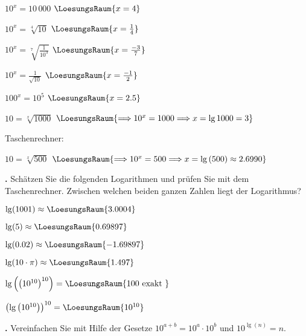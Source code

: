 \begin{bbwAufgabenBlock}
\item $10^x = 10\,000$ $\LoesungsRaum{x=4}$

\item $10^x = \sqrt[4]{10}$ $\LoesungsRaum{x=\frac14}$
\item $10^x = \sqrt[7]{\frac1{10^3}}$ $\LoesungsRaum{x=\frac{-3}{7}}$
\item $10^x = \frac{1}{\sqrt{10}}$ $\LoesungsRaum{x=\frac{-1}2}$
\item $100^x = 10^5$ $\LoesungsRaum{x=2.5}$

\item $10 = \sqrt[x]{1000}$ $\LoesungsRaum{\Longrightarrow 10^x=1000 \Longrightarrow x=\lg{1000} = 3}$


\vspace{2mm} Taschenrechner:
\item $10 = \sqrt[x]{500}$ $\LoesungsRaum{\Longrightarrow 10^x=500 \Longrightarrow x=\lg{}(500) \approx 2.6990}$


\end{bbwAufgabenBlock}

\newpage

\textbf{\bbwAufgabenNummer{}.}
Schätzen Sie die folgenden Logarithmen und prüfen Sie mit dem
Taschenrechner. Zwischen welchen beiden ganzen Zahlen liegt der Logarithmus?


\begin{bbwAufgabenBlock}
\item $\lg(1001) \approx  \LoesungsRaum{3.0004}$
\item $\lg(5) \approx  \LoesungsRaum{0.69897}$
\item $\lg(0.02) \approx  \LoesungsRaum{-1.69897}$
\item $\lg(10\cdot{}\pi) \approx  \LoesungsRaum{1.497}$
\seitenUmbruchImAufgabenteil{}
\item $\lg\left(\left(10^{10}\right)^{10}\right) =  \LoesungsRaum{100 \text{ exakt }}$
\item $\left(\lg\left(10^{10}\right)\right)^{10} =  \LoesungsRaum{10^{10}}$

\end{bbwAufgabenBlock}
\newpage

\textbf{\bbwAufgabenNummer{}.}
Vereinfachen Sie mit Hilfe der Gesetze $10^{a+b}=10^a\cdot{} 10^b$ und  $10^{\lg(n)} = n$.


